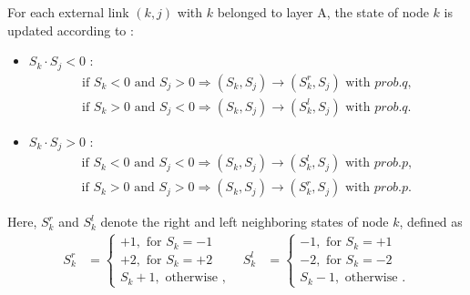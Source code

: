 For each external link $(k,j)$ with $k$ belonged to layer A, the state of node $k$ is updated according to :
\begin{itemize}
	\item $S_k \cdot S_j < 0$ :
	\begin{align}
	\mbox{if } S_k<0 \mbox{ and } S_j>0  \Rightarrow (S_k, S_j) \rightarrow (S_k^r, S_j) \mbox{ with } prob.q,\\
	\mbox{if } S_k>0 \mbox{ and } S_j<0  \Rightarrow (S_k, S_j) \rightarrow (S_k^l, S_j) \mbox{ with } prob.q.
	\end{align}
	\item $S_k \cdot S_j > 0$ :
	\begin{align}
	\mbox{if } S_k<0 \mbox{ and } S_j<0  \Rightarrow (S_k, S_j) \rightarrow (S_k^l, S_j) \mbox{ with } prob.p,\\
	\mbox{if } S_k>0 \mbox{ and } S_j>0  \Rightarrow (S_k, S_j) \rightarrow (S_k^r, S_j) \mbox{ with } prob.p.
	\end{align}
\end{itemize}

Here, $S_k^r$ and $S_k^l$ denote the right and left neighboring states of node $k$, defined as
\begin{align}
S_k^r &= \left\{\begin{matrix}
+1,\mbox{ for } S_k = -1\\
+2,\mbox{ for } S_k = +2\\ 
S_k + 1,\mbox{ otherwise }, 
\end{matrix}\right. &
S_k^l &= \left\{\begin{matrix}
-1,\mbox{ for } S_k= +1
\\ -2,\mbox{ for } S_k=-2
\\ S_k - 1,\mbox{ otherwise }.
\end{matrix}\right.
\end{align}

